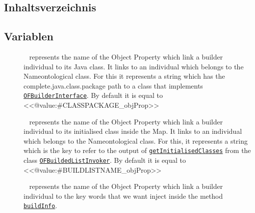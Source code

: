 \subsection{Inhaltsverzeichnis}
\subsection{Variablen}
\begin{description}
\item[{\label{ontologyFramework.OFRunning.OFInitialising.OFBuilderCommon.CLASSPACKAGE_objProp}}]
~ represents the name of the Object Property which link a builder
  individual to its Java class. It links to an individual which
  belongs to the \textquotedbl Name\textquotedbl  ontological class. For this it represents
  a string which has the complete.java.class.package path to a class
  that implements \texttt{\hyperlink{ontologyFramework.OFRunning.OFInitialising.OFBuilderInterface<T>-class}{OFBuilderInterface}}.
  By default it is equal to <<@value:#CLASSPACKAGE_objProp>>
\item[{\label{ontologyFramework.OFRunning.OFInitialising.OFBuilderCommon.BUILDLISTNAME_objProp}}]
~ represents the name of the Object Property which link a builder
  individual to its initialised class inside the Map. It links to an individual which
  belongs to the \textquotedbl Name\textquotedbl  ontological class. For this, it represents
  a string which is the key to refer to the output of 
  \texttt{\hyperlink{ontologyFramework.OFRunning.OFInitialising.OFBuilderInterface.getInitialisedClasses()}{getInitialisedClasses}}
  from the class \texttt{\hyperlink{ontologyFramework.OFRunning.OFInvokingManager.OFBuildedListInvoker-class}{OFBuildedListInvoker}}.
  By default it is equal to <<@value:#BUILDLISTNAME_objProp>>
\item[{\label{ontologyFramework.OFRunning.OFInitialising.OFBuilderCommon.HASKEYWORDS_objProp}}]
~ represents the name of the Object Property which link a builder
  individual to the key words that we want inject inside the method
  \texttt{\hyperlink{ontologyFramework.OFRunning.OFInitialising.OFBuilderInterface.buildInfo(java.lang.String[],ontologyFramework.OFContextManagement.OWLReferences,ontologyFramework.OFRunning.OFInvokingManager.OFBuildedListInvoker)}{buildInfo}}. 

\end{description}
